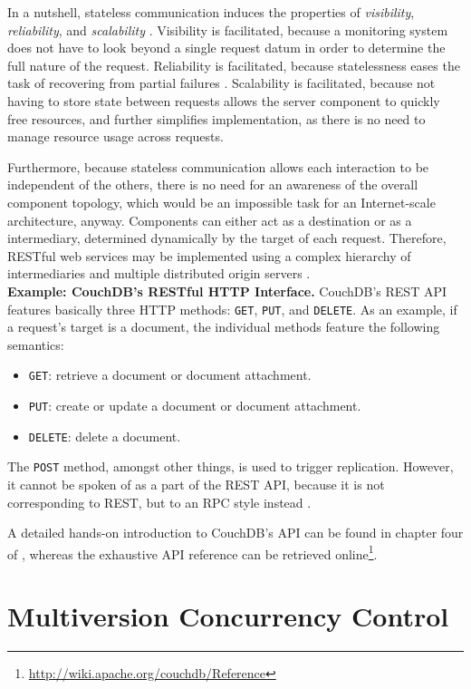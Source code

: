 In a nutshell, stateless communication induces the properties of \emph{visibility}, \emph{reliability}, and \emph{scalability} \cite[p.~79]{Fie00}. Visibility is facilitated, because a monitoring system does not have to look beyond a single request datum in order to determine the full nature of the request. Reliability is facilitated, because statelessness eases the task of recovering from partial failures \cite{KWWW94}. Scalability is facilitated, because not having to store state between requests allows the server component to quickly free resources, and further simplifies implementation, as there is no need to manage resource usage across requests.

Furthermore, because stateless communication allows each interaction to be independent of the others, there is no need for an awareness of the overall component topology, which would be an impossible task for an Internet-scale architecture, anyway. Components can either act as a destination or as a intermediary, determined dynamically by the target of each request. Therefore, RESTful web services may be implemented using a complex hierarchy of intermediaries and multiple distributed origin servers \cite[p.~99]{Fie00}.\\

\noindent
{\bf Example: CouchDB's RESTful HTTP Interface.}
CouchDB's REST API features basically three HTTP methods: {\tt GET}, {\tt PUT}, and {\tt DELETE}. As an example, if a request's target is a document, the individual methods feature the following semantics:

\begin{itemize}
	\item {\tt GET}: retrieve a document or document attachment.
	\item {\tt PUT}: create or update a document or document attachment.
	\item {\tt DELETE}: delete a document.
\end{itemize}  

The {\tt POST} method, amongst other things, is used to trigger replication. However, it cannot be spoken of as a part of the REST API, because it is not corresponding to REST, but to an RPC style instead \cite[p.~44]{ASL10}.

A detailed hands-on introduction to CouchDB's API can be found in chapter four of \cite{ASL10}, whereas the exhaustive API reference can be retrieved online\footnote{\url{http://wiki.apache.org/couchdb/Reference}}.


\section{Multiversion Concurrency Control}
\label{Multiversion Concurrency Control}


